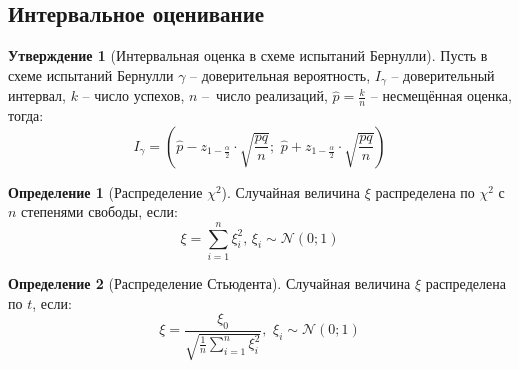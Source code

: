 \documentclass[12pt]{article}
\theoremstyle{definition}
\newtheorem{definition}{Определение}
\newtheorem{statement}[theorem]{Утверждение}
\begin{document}
\subsection{Интервальное оценивание}

\begin{statement}[Интервальная оценка в схеме испытаний Бернулли]
    Пусть в схеме испытаний Бернулли $\gamma$ – доверительная вероятность, $I_\gamma$ – доверительный интервал, $k$ – число успехов, $n$ – число реализаций, $\hat{p}=\frac{k}{n}$ – несмещённая оценка, тогда:
    $$I_\gamma=\left(\hat{p}-z_{1-\frac{\alpha}{2}}\cdot\sqrt{\frac{pq}{n}};\,\,\hat{p}+z_{1-\frac{\alpha}{2}}\cdot\sqrt{\frac{pq}{n}}\right)$$
\end{statement}

\begin{definition}[Распределение $\chi^2$]
    Случайная величина $\xi$ распределена по $\chi^2$ с $n$ степенями свободы, если:
    $$\xi=\sum_{i=1}^{n}\xi_i^2,\,\xi_i\sim\mathcal{N}(0;1)$$
\end{definition}
\begin{definition}[Распределение Стьюдента]
    Случайная величина $\xi$ распределена по $t$, если:
    $$\xi=\dfrac{\xi_0}{\sqrt{\frac{1}{n}\sum\limits_{i=1}^{n}\xi_i^2}},\,\,\xi_i\sim\mathcal{N}(0;1)$$
\end{definition}
\end{document}
